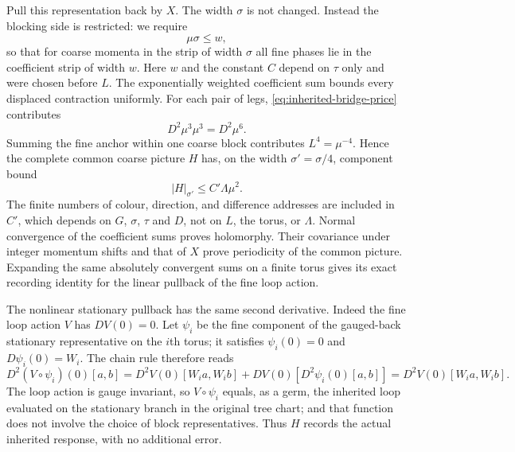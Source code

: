 Pull this representation back by $X$. The width $\sigma$ is not
changed. Instead the blocking side is restricted: we require
\begin{equation}\label{eq:inherited-side-guard}
                              \mu\sigma\le w ,
\end{equation}
so that for coarse momenta in the strip of width $\sigma$ all fine
phases lie in the coefficient strip of width $w$. Here $w$ and the
constant $C$ depend on $\tau$ only and were chosen before $L$. The
exponentially weighted coefficient sum bounds every displaced
contraction uniformly. For each pair of legs,
\eqref{eq:inherited-bridge-price} contributes
\[
                         D^2\mu^3\mu^3=D^2\mu^6.
\]
Summing the fine anchor within one coarse block contributes
$L^4=\mu^{-4}$. Hence the complete common coarse picture $H$
has, on the width $\sigma'=\sigma/4$,
component bound
\begin{equation}\label{eq:inherited-strip-gain}
                              |H|_{\sigma'}\le C'\Lambda\mu^2.
\end{equation}
The finite numbers of colour, direction, and difference addresses
are included in $C'$, which depends on $G$, $\sigma$, $\tau$ and $D$,
not on $L$, the torus, or $\Lambda$. Normal convergence of the
coefficient sums proves holomorphy. Their covariance under
integer momentum shifts and that of $X$ prove periodicity of the
common picture. Expanding the same absolutely convergent sums
on a finite torus gives its exact recording identity for the
linear pullback of the fine loop action.

The nonlinear stationary pullback has the same second derivative.
Indeed the fine loop action $V$ has $DV(0)=0$. Let $\psi_i$ be the
fine component of the gauged-back stationary representative on the
$i$th torus; it satisfies $\psi_i(0)=0$ and $D\psi_i(0)=W_i$. The
chain rule therefore reads
\[
 D^2(V\circ\psi_i)(0)[a,b]
       =D^2V(0)[W_ia,W_ib]+DV(0)[D^2\psi_i(0)[a,b]]
       =D^2V(0)[W_ia,W_ib].
\]
The loop action is gauge invariant, so $V\circ\psi_i$ equals, as a
germ, the inherited loop evaluated on the stationary branch in the
original tree chart; and that function does not involve the choice of
block representatives. Thus $H$ records the actual inherited response,
with no additional error.

